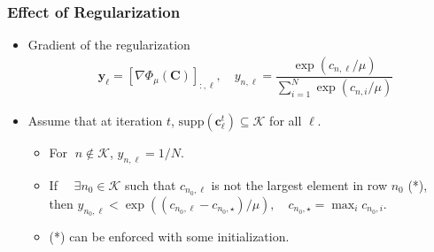 \documentclass[10pt,xcolor={usenames,dvipsnames,table}]{beamer}
\newcommand{\T}{\!\top\!}
\begin{document}
\begin{frame}[label=current]
\end{frame}

\begin{frame}[label=current]
    \frametitle{Effect of Regularization}
    \begin{itemize}
        \item Gradient of the regularization 
\begin{align*} 
    &\bm{y}_\ell = [\nabla \varPhi_{\mu}(\bm{C})]_{:, \ell} , \quad 
    y_{n,\ell} = \dfrac{\exp (c_{n, \ell}/\mu)}{\sum^{N}_{i=1} \exp(c_{n, i}/\mu)} 
\end{align*}
        \item Assume that at iteration $t$,  $\text{supp}(\bm{c}^{t}_\ell) \subseteq \mathcal{K}$ for all $\ell$.
\begin{itemize}
    \item For $\; n \notin \mathcal{K}$,
        $ y_{n, \ell} = 1/N$. 
    \item If $\quad \exists n_0 \in \mathcal{K}$ such that $c_{n_0, \ell}$ is not the largest element in row $n_0$ (*), then
    $ y_{n_0, \ell} < \exp ((c_{n_0, \ell} - c_{n_0, \star})/\mu), \quad c_{n_0, \star} = \max_{i} c_{n_0, i} $.
\item (*) can be enforced with some initialization.
\end{itemize}


\end{itemize}
\end{frame}
\end{document}
